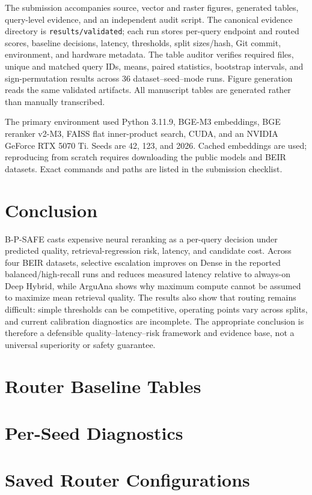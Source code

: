 \documentclass[10pt,journal]{IEEEtran}
\newcommand{\bpsafe}{B-P-SAFE}
\newcommand{\deephybrid}{Deep Hybrid}
\begin{document}
The submission accompanies source, vector and raster figures, generated tables, query-level evidence, and an independent audit script. The canonical evidence directory is \texttt{results/validated}; each run stores per-query endpoint and routed scores, baseline decisions, latency, thresholds, split sizes/hash, Git commit, environment, and hardware metadata. The table auditor verifies required files, unique and matched query IDs, means, paired statistics, bootstrap intervals, and sign-permutation results across 36 dataset--seed--mode runs. Figure generation reads the same validated artifacts. All manuscript tables are generated rather than manually transcribed.

The primary environment used Python 3.11.9, BGE-M3 embeddings, BGE reranker v2-M3, FAISS flat inner-product search, CUDA, and an NVIDIA GeForce RTX 5070 Ti. Seeds are 42, 123, and 2026. Cached embeddings are used; reproducing from scratch requires downloading the public models and BEIR datasets. Exact commands and paths are listed in the submission checklist.

\section{Conclusion}

\bpsafe{} casts expensive neural reranking as a per-query decision under predicted quality, retrieval-regression risk, latency, and candidate cost. Across four BEIR datasets, selective escalation improves on Dense in the reported balanced/high-recall runs and reduces measured latency relative to always-on \deephybrid{}, while ArguAna shows why maximum compute cannot be assumed to maximize mean retrieval quality. The results also show that routing remains difficult: simple thresholds can be competitive, operating points vary across splits, and current calibration diagnostics are incomplete. The appropriate conclusion is therefore a defensible quality--latency--risk framework and evidence base, not a universal superiority or safety guarantee.

\clearpage
\onecolumn
\appendices

\section{Router Baseline Tables}
\label{app:baselines}


\clearpage

\section{Per-Seed Diagnostics}
\label{app:multiseed}

\clearpage

\section{Saved Router Configurations}
\label{app:configs}

\clearpage

\twocolumn


\end{document}
